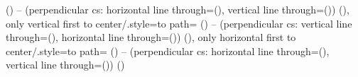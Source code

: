 {{{        \fi
      \fi
      \endpgfextra
    (\tikztostart) -- (perpendicular cs: horizontal line through={(\tikztostart)},
                                         vertical line through={(\tikztotarget)})
    \tikztonodes \ifx\tikz@origtotarget\pgfutil@empty\else\iftikz@ortho@preflush(\tikz@origtotarget)\fi\fi}},
  only vertical first to center/.style={to path={
      \pgfextra
        \let\tikz@origtotarget\tikztotarget
      \endpgfextra
    (\tikztostart) -- (perpendicular cs: vertical line through={(\tikztostart)},
                                         horizontal line through={(\tikztotarget)})
    \tikztonodes \ifx\tikz@origtotarget\pgfutil@empty\else\iftikz@ortho@preflush(\tikz@origtotarget)\fi\fi}},
  only horizontal first to center/.style={to path={
      \pgfextra
        \let\tikz@origtotarget\tikztotarget
      \endpgfextra
    (\tikztostart) -- (perpendicular cs: horizontal line through={(\tikztostart)},
                                         vertical line through={(\tikztotarget)})
    \tikztonodes \ifx\tikz@origtotarget\pgfutil@empty\else\iftikz@ortho@preflush(\tikz@origtotarget)\fi\fi}}%
}
\endinput
